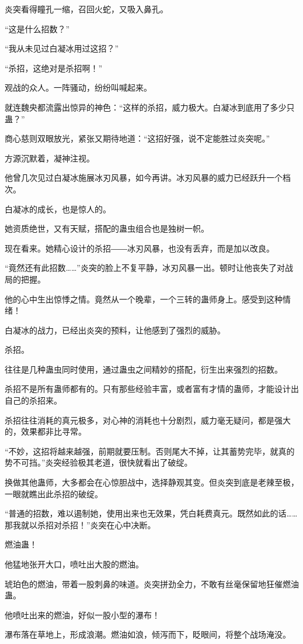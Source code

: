 \begin{this_body}
炎突看得瞳孔一缩，召回火蛇，又吸入鼻孔。

“这是什么招数？”

“我从未见过白凝冰用过这招？”

“杀招，这绝对是杀招啊！”

观战的众人。一阵骚动，纷纷叫喊起来。

就连魏央都流露出惊异的神色：“这样的杀招，威力极大。白凝冰到底用了多少只蛊？”

商心慈则双眼放光，紧张又期待地道：“这招好强，说不定能胜过炎突呢。”

方源沉默着，凝神注视。

他曾几次见过白凝冰施展冰刃风暴，如今再讲。冰刃风暴的威力已经跃升一个档次。

白凝冰的成长，也是惊人的。

她资质绝世，又有天赋，搭配的蛊虫组合也是独树一帜。

现在看来。她精心设计的杀招――冰刃风暴，也没有丢弃，而是加以改良。

“竟然还有此招数……”炎突的脸上不复平静，冰刃风暴一出。顿时让他丧失了对战局的把握。

他的心中生出惊悸之情。竟然从一个晚辈，一个三转的蛊师身上。感受到这种情绪！

白凝冰的战力，已经出炎突的预料，让他感到了强烈的威胁。

杀招。

往往是几种蛊虫同时使用，通过蛊虫之间精妙的搭配，衍生出来强烈的招数。

杀招不是所有蛊师都有的。只有那些经验丰富，或者富有才情的蛊师，才能设计出自己的杀招来。

杀招往往消耗的真元极多，对心神的消耗也十分剧烈，威力毫无疑问，都是强大的，效果都非比寻常。

“不妙，这招将越来越强，前期就要压制。否则尾大不掉，让其蓄势完毕，就真的势不可挡。”炎突经验极其老道，很快就看出了破绽。

换做其他蛊师，大多都会在心惊胆战中，选择静观其变。但炎突到底是老辣至极，一眼就瞧出此杀招的破绽。

“普通的招数，难以遏制她，使用出来也无效果，凭白耗费真元。既然如此的话……那我就以杀招对杀招！”炎突在心中决断。

燃油蛊！

他猛地张开大口，喷吐出大股的燃油。

琥珀色的燃油，带着一股刺鼻的味道。炎突拼劲全力，不敢有丝毫保留地狂催燃油蛊。

他喷吐出来的燃油，好似一股小型的瀑布！

瀑布落在草地上，形成浪潮。燃油如浪，倾泻而下，眨眼间，将整个战场淹没。


\end{this_body}

